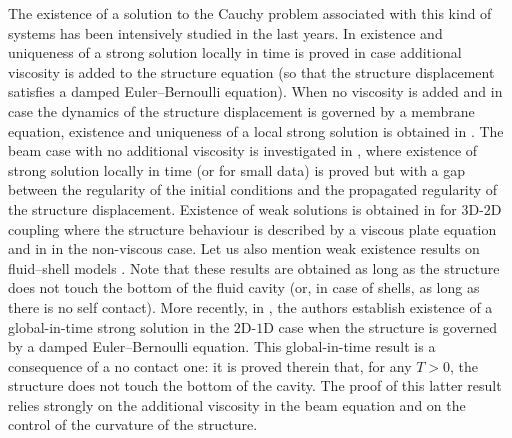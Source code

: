 \documentclass[11pt]{article}
\theoremstyle{remark}
\theoremstyle{definition}
\begin{document}
The existence of a solution to the Cauchy problem associated with this kind of systems has been intensively studied in the last years. In \cite{DaVeiga, Lequeurre11, Lequeurre13} existence and uniqueness of a strong solution locally in time is proved in case additional viscosity is added to the structure equation (so that the structure displacement satisfies a damped Euler--Bernoulli equation). When no viscosity is added and in case the dynamics of the structure displacement is governed by a membrane equation, existence and uniqueness of a local strong solution is obtained in \cite{Grandmont-Hillairet-Lequeurre}. The beam case with no additional viscosity is investigated in \cite{Badra-Takahashi}, where existence of strong solution locally in time (or for small data) is proved but with a gap between the regularity of the initial conditions and the propagated regularity of the structure displacement. Existence of weak solutions is obtained in \cite{Chambolle-etal} for $3$D-$2$D coupling where the structure behaviour is described by a viscous plate equation and in \cite{Grandmont08, Muha-Canic13} in the non-viscous case. Let us also mention weak existence results on fluid--shell models \cite{Lengeler, Muha-Schwarzacher}. Note that these results are obtained as long as the structure does not touch the bottom of the fluid cavity (or, in case of shells, as long as there is no self contact). More recently, in \cite{Grandmont-Hillairet}, the authors establish existence of a global-in-time strong solution in the $2$D-$1$D case when the structure is governed by a damped Euler--Bernoulli equation. This global-in-time result is a consequence of a no contact one: it is proved therein that, for any $T>0$, the structure does not touch the bottom of the cavity. The proof of this latter result relies strongly on the additional viscosity in the beam equation and on the control of the curvature of the structure.
\end{document}
